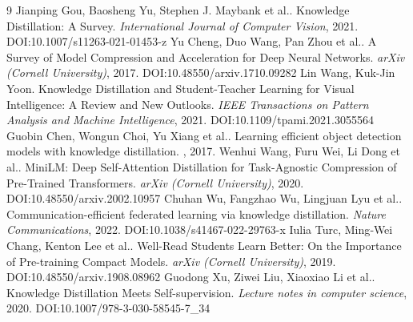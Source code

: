 \documentclass[11pt]{article}
\begin{document}
\begin{thebibliography}{9}
 Jianping Gou, Baosheng Yu, Stephen J. Maybank et al.. Knowledge Distillation: A Survey. \emph{International Journal of Computer Vision}, 2021. DOI:10.1007/s11263-021-01453-z
 Yu Cheng, Duo Wang, Pan Zhou et al.. A Survey of Model Compression and Acceleration for Deep Neural Networks. \emph{arXiv (Cornell University)}, 2017. DOI:10.48550/arxiv.1710.09282
 Lin Wang, Kuk-Jin Yoon. Knowledge Distillation and Student-Teacher Learning for Visual Intelligence: A Review and New Outlooks. \emph{IEEE Transactions on Pattern Analysis and Machine Intelligence}, 2021. DOI:10.1109/tpami.2021.3055564
 Guobin Chen, Wongun Choi, Yu Xiang et al.. Learning efficient object detection models with knowledge distillation. \emph{}, 2017. 
 Wenhui Wang, Furu Wei, Li Dong et al.. MiniLM: Deep Self-Attention Distillation for Task-Agnostic Compression of Pre-Trained Transformers. \emph{arXiv (Cornell University)}, 2020. DOI:10.48550/arxiv.2002.10957
 Chuhan Wu, Fangzhao Wu, Lingjuan Lyu et al.. Communication-efficient federated learning via knowledge distillation. \emph{Nature Communications}, 2022. DOI:10.1038/s41467-022-29763-x
 Iulia Turc, Ming‐Wei Chang, Kenton Lee et al.. Well-Read Students Learn Better: On the Importance of Pre-training Compact Models. \emph{arXiv (Cornell University)}, 2019. DOI:10.48550/arxiv.1908.08962
 Guodong Xu, Ziwei Liu, Xiaoxiao Li et al.. Knowledge Distillation Meets Self-supervision. \emph{Lecture notes in computer science}, 2020. DOI:10.1007/978-3-030-58545-7\_34
\end{thebibliography}
\end{document}
